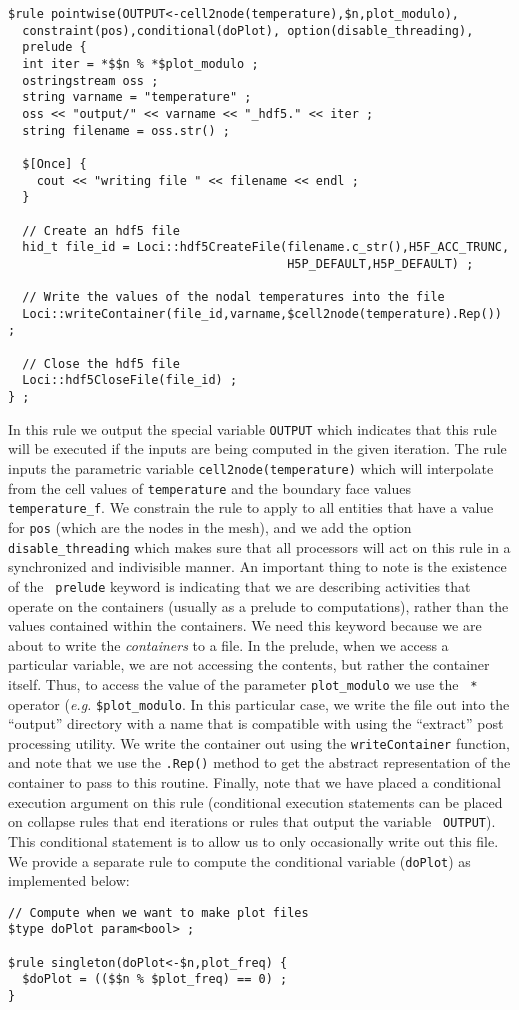 \documentclass[10pt,epsf,letterpaper,twoside]{book}
\begin{document}
\newpage
\begin{verbatim}
$rule pointwise(OUTPUT<-cell2node(temperature),$n,plot_modulo),
  constraint(pos),conditional(doPlot), option(disable_threading),
  prelude {
  int iter = *$$n % *$plot_modulo ;
  ostringstream oss ;
  string varname = "temperature" ;
  oss << "output/" << varname << "_hdf5." << iter ;
  string filename = oss.str() ;

  $[Once] {
    cout << "writing file " << filename << endl ;
  }

  // Create an hdf5 file
  hid_t file_id = Loci::hdf5CreateFile(filename.c_str(),H5F_ACC_TRUNC,
                                       H5P_DEFAULT,H5P_DEFAULT) ;

  // Write the values of the nodal temperatures into the file
  Loci::writeContainer(file_id,varname,$cell2node(temperature).Rep()) ;

  // Close the hdf5 file
  Loci::hdf5CloseFile(file_id) ;
} ;
\end{verbatim}
In this rule we output the special variable {\tt OUTPUT} which
indicates that this rule will be executed if the inputs are being
computed in the given iteration.  The rule inputs the parametric
variable {\tt cell2node(temperature)} which will interpolate from the
cell values of {\tt temperature} and the boundary face values {\tt
  temperature\_f}.  We constrain the rule to apply to all entities that
have a value for {\tt pos} (which are the nodes in the mesh), and we
add the option {\tt disable\_threading} which makes sure that all
processors will act on this rule in a synchronized and indivisible
manner.  An important thing to note is the existence of the {\tt
  prelude} keyword is indicating that we are describing activities
that operate on the containers (usually as a prelude to computations),
rather than the values contained within the containers.  We need this
keyword because we are about to write the {\it containers} to a file.
In the prelude, when we access a particular variable, we are not
accessing the contents, but rather the container itself.  Thus, to
access the value of the parameter {\tt plot\_modulo} we use the {\tt
  *} operator ({\it e.g.} {\tt *\$plot\_modulo}.  In this particular
case, we write the file out into the ``output'' directory with a name
that is compatible with using the ``extract'' post processing
utility.  We write the container out using the {\tt writeContainer}
function, and note that we use the {\tt .Rep()} method to get the
abstract representation of the container to pass to this routine.
Finally, note that we have placed a conditional execution argument on
this rule (conditional execution statements can be placed on collapse
rules that end iterations or rules that output the variable {\tt
  OUTPUT}).  This conditional statement is to allow us to only
occasionally write out this file.  We provide a separate rule to
compute the conditional variable ({\tt doPlot}) as implemented below:
\newpage
\begin{verbatim}
// Compute when we want to make plot files
$type doPlot param<bool> ;

$rule singleton(doPlot<-$n,plot_freq) {
  $doPlot = (($$n % $plot_freq) == 0) ;
}
\end{verbatim}
\end{document}
